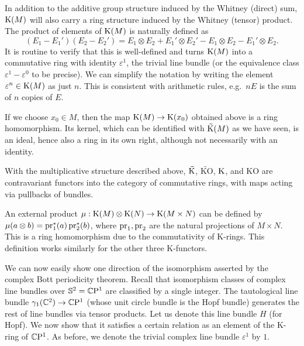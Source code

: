 In addition to the additive group structure induced by the Whitney (direct) sum, $\mathrm{K}(M)$ will also carry a ring structure induced by the Whitney (tensor) product. The product of elements of $\mathrm{K}(M)$ is naturally defined as 
\[(E_1-E_1')(E_2-E_2')=E_1\otimes E_2+ E_1'\otimes E_2'-E_1\otimes E_2-E_1'\otimes E_2.\]
It is routine to verify that this is well-defined and turns $\mathrm{K}(M)$ into a commutative ring with identity $\varepsilon^1$, the trivial line bundle (or the equivalence class $\varepsilon^1-\varepsilon^0$ to be precise). We can simplify the notation by writing the element $\varepsilon^n\in \mathrm{K}(M)$ as just $n$. This is consistent with arithmetic rules, e.g.\ $nE$ is the sum of $n$ copies of $E$.

If we choose $x_0\in M$, then the map $\mathrm{K}(M)\to \mathrm{K}(x_0)$ obtained above is a ring homomorphism. Its kernel, which can be identified with $\wt{\rmK}(M)$ as we have seen, is an ideal, hence also a ring in its own right, although not necessarily with an identity.

\begin{defn}[K-rings]
    With the multiplicative structure described above, $\wt{\rmK}$, $\widetilde{\mathrm{KO}}$, $\mathrm{K}$, and $\mathrm{KO}$ are contravariant functors into the category of commutative rings, with maps acting via pullbacks of bundles.
\end{defn}

\begin{defn}
    An external product $\mu:\mathrm{K}(M)\otimes \mathrm{K}(N)\to \mathrm{K}(M\times N)$ can be defined by $\mu(a\otimes b)=\operatorname{pr}_1^\ast(a)\operatorname{pr}_2^\ast(b)$, where $\operatorname{pr}_1,\operatorname{pr}_2$ are the natural projections of $M\times N$. This is a ring homomorphism due to the commutativity of K-rings. This definition works similarly for the other three K-functors.
\end{defn}


We can now easily show one direction of the isomorphism asserted by the complex Bott periodicity theorem. Recall that isomorphism classes of complex line bundles over $\mathbb{S}^2=\mathbb{C}\mathrm{P}^1$ are classified by a single integer. The tautological line bundle $\gamma_1(\mathbb{C}^2)\to \mathbb{C}\mathrm{P}^1$ (whose unit circle bundle is the Hopf bundle) generates the rest of line bundles via tensor products. Let us denote this line bundle $H$ (for Hopf). We now show that it satisfies a certain relation as an element of the K-ring of $\mathbb{C}\mathrm{P}^1$. As before, we denote the trivial complex line bundle $\varepsilon^1$ by $1$.


